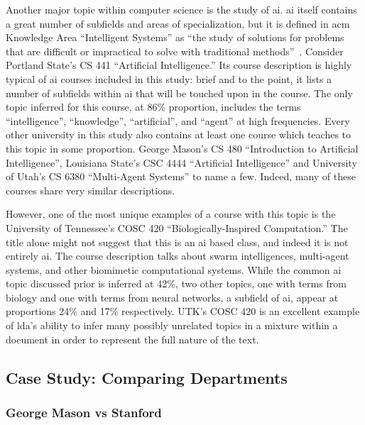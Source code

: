 Another major topic within computer science is the study of \ac{ai}.
\ac{ai} itself contains a great number of subfields and areas of specialization, but it is defined in \ac{acm} Knowledge Area ``Intelligent Systems'' as ``the study of solutions for problems that are difficult or impractical to solve with traditional methods''~\cite{CS2013}.
Consider Portland State's CS 441 ``Artificial Intelligence.''
Its course description is highly typical of \ac{ai} courses included in this study: brief and to the point, it lists a number of subfields within \ac{ai} that will be touched upon in the course.
The only topic inferred for this course, at 86\% proportion, includes the terms ``intelligence'', ``knowledge'', ``artificial'', and ``agent'' at high frequencies.
Every other university in this study also contains at least one course which teaches to this topic in some proportion.
George Mason's CS 480 ``Introduction to Artificial Intelligence'', Louisiana State's CSC 4444 ``Artificial Intelligence'' and University of Utah's CS 6380 ``Multi-Agent Systems'' to name a few.
Indeed, many of these courses share very similar descriptions.


However, one of the most unique examples of a course with this topic is the University of Tennessee's COSC 420 ``Biologically-Inspired Computation.''
The title alone might not suggest that this is an \ac{ai} based class, and indeed it is not entirely \ac{ai}.
The course description talks about swarm intelligences, multi-agent systems, and other biomimetic computational systems.
While the common \ac{ai} topic discussed prior is inferred at 42\%, two other topics, one with terms from biology and one with terms from neural networks, a subfield of \ac{ai}, appear at proportions 24\% and 17\% respectively.
UTK's COSC 420 is an excellent example of \ac{lda}'s ability to infer many possibly unrelated topics in a mixture within a document in order to represent the full nature of the text.


\subsection{Case Study: Comparing Departments}
\label{sec:eval-comparison}


\subsubsection{George Mason vs Stanford}
\label{sec:eval-comparison-stanford}

